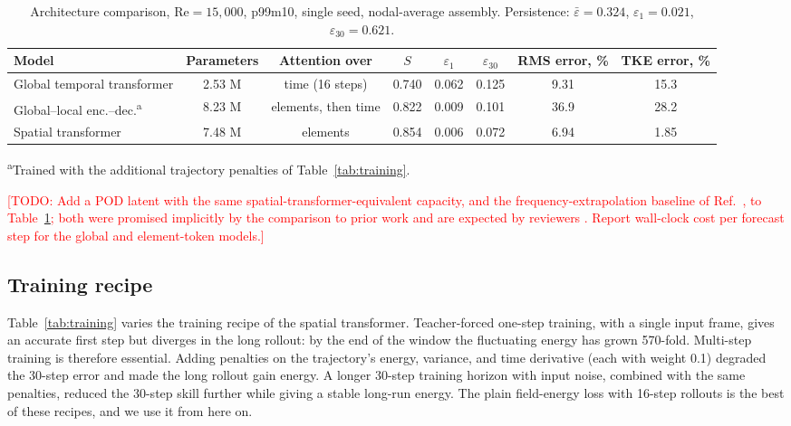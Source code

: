 \documentclass[conf]{new-aiaa}
\newcommand{\todo}[1]{\textcolor{red}{[TODO: #1]}}
\newcommand{\Rey}{\mathrm{Re}}
\begin{document}
\begin{table}[!tbp]
  \centering
  \small
  \caption{Architecture comparison, $\Rey=15{,}000$, p99m10, single seed, nodal-average assembly. Persistence: $\bar\varepsilon=0.324$, $\varepsilon_{1}=0.021$, $\varepsilon_{30}=0.621$.}
  \label{tab:arch}
  \begin{tabular}{lccccccc}
    \toprule
    Model & Parameters & Attention over & $S$ & $\varepsilon_{1}$ & $\varepsilon_{30}$ & RMS error, \% & TKE error, \% \\
    \midrule
    Global temporal transformer & 2.53 M & time (16 steps) & 0.740 & 0.062 & 0.125 & 9.31 & 15.3 \\
    Global--local enc.--dec.\textsuperscript{a} & 8.23 M & elements, then time & 0.822 & 0.009 & 0.101 & 36.9 & 28.2 \\
    Spatial transformer & 7.48 M & elements & 0.854 & 0.006 & 0.072 & 6.94 & 1.85 \\
    \bottomrule
  \end{tabular}

  \smallskip
  {\footnotesize \textsuperscript{a}Trained with the additional trajectory penalties of Table~\ref{tab:training}.}
\end{table}

\todo{Add a POD latent with the same spatial-transformer-equivalent capacity, and the frequency-extrapolation baseline of Ref.~\cite{morton2026scitech}, to Table~\ref{tab:arch}; both were promised implicitly by the comparison to prior work and are expected by reviewers \cite{mcgreivy2024weak}. Report wall-clock cost per forecast step for the global and element-token models.}

\subsection{Training recipe}
\label{sec:res_training}
Table~\ref{tab:training} varies the training recipe of the spatial transformer. Teacher-forced one-step training, with a single input frame, gives an accurate first step but diverges in the long rollout: by the end of the window the fluctuating energy has grown 570-fold. Multi-step training is therefore essential. Adding penalties on the trajectory's energy, variance, and time derivative (each with weight 0.1) degraded the 30-step error and made the long rollout gain energy. A longer 30-step training horizon with input noise, combined with the same penalties, reduced the 30-step skill further while giving a stable long-run energy. The plain field-energy loss with 16-step rollouts is the best of these recipes, and we use it from here on.
\end{document}
